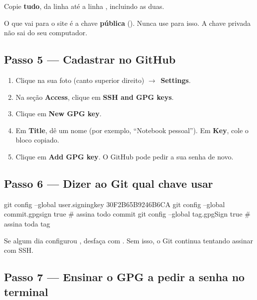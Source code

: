 Copie \textbf{tudo}, da linha  até a linha , incluindo as duas.

\begin{aviso}
O que vai para o site é a chave \textbf{pública} (). Nunca use  para isso. A chave privada não sai do seu computador.
\end{aviso}

\subsection{Passo 5 — Cadastrar no GitHub}

\begin{enumerate}
  \item Clique na sua foto (canto superior direito) \(\rightarrow\)\ \textbf{Settings}.
  \item Na seção \textbf{Access}, clique em \textbf{SSH and GPG keys}.
  \item Clique em \textbf{New GPG key}.
  \item Em \textbf{Title}, dê um nome (por exemplo, \enquote{Notebook pessoal}). Em \textbf{Key}, cole o bloco copiado.
  \item Clique em \textbf{Add GPG key}. O GitHub pode pedir a sua senha de novo.
\end{enumerate}

\subsection{Passo 6 — Dizer ao Git qual chave usar}

\begin{bashcode}
git config --global user.signingkey 30F2B65B9246B6CA
git config --global commit.gpgsign true     # assina todo commit
git config --global tag.gpgSign true        # assina toda tag
\end{bashcode}

\begin{dica}
Se algum dia configurou , desfaça com . Sem isso, o Git continua tentando assinar com SSH.
\end{dica}

\subsection{Passo 7 — Ensinar o GPG a pedir a senha no terminal}

